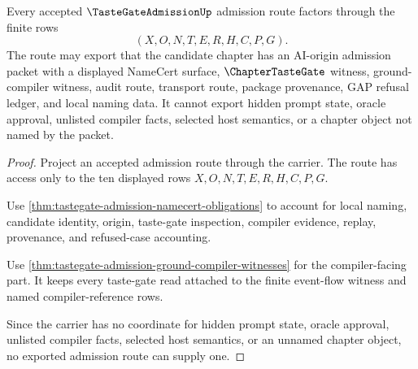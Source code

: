 \begin{theorem}
\label{thm:tastegate-admission-non-escape}
Every accepted $\TasteGateAdmissionUp$ admission route factors through the finite rows
$$
(X,O,N,T,E,R,H,C,P,G).
$$
The route may export that the candidate chapter has an AI-origin admission packet with a displayed NameCert surface, $\ChapterTasteGate$ witness, ground-compiler witness, audit route, transport route, package provenance, GAP refusal ledger, and local naming data. It cannot export hidden prompt state, oracle approval, unlisted compiler facts, selected host semantics, or a chapter object not named by the packet.
\end{theorem}
\begin{proof}
Project an accepted admission route through the carrier. The route has access only to the ten displayed rows $X,O,N,T,E,R,H,C,P,G$.

Use \autoref{thm:tastegate-admission-namecert-obligations} to account for local naming, candidate identity, origin, taste-gate inspection, compiler evidence, replay, provenance, and refused-case accounting.

Use \autoref{thm:tastegate-admission-ground-compiler-witnesses} for the compiler-facing part. It keeps every taste-gate read attached to the finite event-flow witness and named compiler-reference rows.

Since the carrier has no coordinate for hidden prompt state, oracle approval, unlisted compiler facts, selected host semantics, or an unnamed chapter object, no exported admission route can supply one.
\end{proof}


